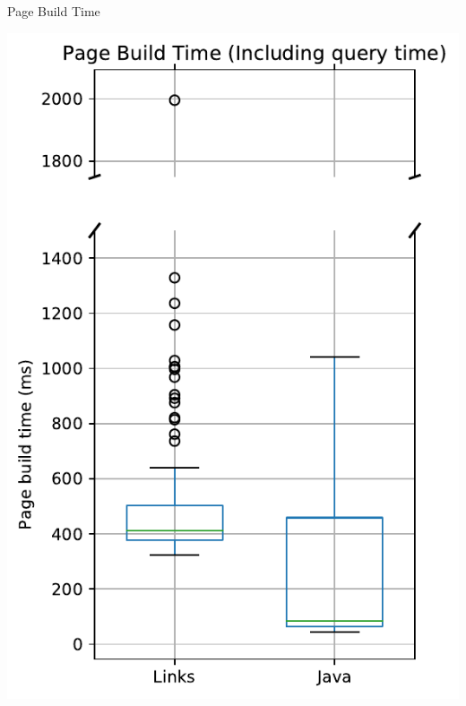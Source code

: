 \documentclass[11.5pt, aspectratio=169]{beamer}
\begin{document}
\begin{frame}{Page Build Time}
\begin{minipage}[t]{0.45\textwidth}
    \includegraphics[scale=0.3]{images/objectdisplay_pagebuild_incl_box.pdf}


\end{minipage}
\end{frame}
\end{document}
